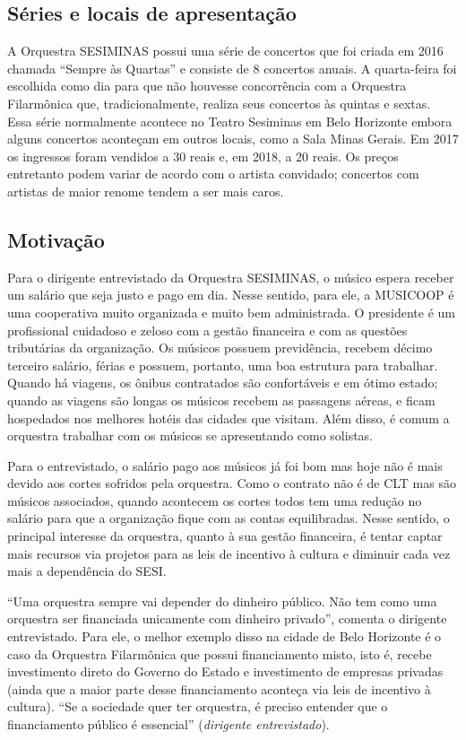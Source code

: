 \documentclass[a4paper, 12pt, openright, oneside, german, french, english, brazil]{abntex2}
\begin{document}
	\subsection{Séries e locais de apresentação}
	
	A Orquestra SESIMINAS possui uma série de concertos que foi criada em 2016 chamada ``Sempre às Quartas'' e consiste de 8 concertos anuais. A quarta-feira foi escolhida como dia para que não houvesse concorrência com a Orquestra Filarmônica que, tradicionalmente, realiza seus concertos às quintas e sextas. Essa série normalmente acontece no Teatro Sesiminas em Belo Horizonte embora alguns concertos aconteçam em outros locais, como a Sala Minas Gerais. Em 2017 os ingressos foram vendidos a 30 reais e, em 2018, a 20 reais. Os preços entretanto podem variar de acordo com o artista convidado; concertos com artistas de maior renome tendem a ser mais caros.
	
	\subsection{Motivação}
	
	Para o dirigente entrevistado da Orquestra SESIMINAS, o músico espera receber um salário que seja justo e pago em dia. Nesse sentido, para ele, a MUSICOOP é uma cooperativa muito organizada e muito bem administrada. O presidente é um profissional cuidadoso e zeloso com a gestão financeira e com as questões tributárias da organização. Os músicos possuem previdência, recebem décimo terceiro salário, férias e possuem, portanto, uma boa estrutura para trabalhar. Quando há viagens, os ônibus contratados são confortáveis e em ótimo estado; quando as viagens são longas os músicos recebem as passagens aéreas, e ficam hospedados nos melhores hotéis das cidades que visitam. Além disso, é comum a orquestra trabalhar com os músicos se apresentando como solistas.
	
	Para o entrevistado, o salário pago aos músicos já foi bom mas hoje não é mais devido aos cortes sofridos pela orquestra. Como o contrato não é de CLT mas são músicos associados, quando acontecem os cortes todos tem uma redução no salário para que a organização fique com as contas equilibradas. Nesse sentido, o principal interesse da orquestra, quanto à sua gestão financeira, é tentar captar mais recursos via projetos para as leis de incentivo à cultura e diminuir cada vez mais a dependência do SESI.
	
	``Uma orquestra sempre vai depender do dinheiro público. Não tem como uma orquestra ser financiada unicamente com dinheiro privado'', comenta o dirigente entrevistado. Para ele, o melhor exemplo disso na cidade de Belo Horizonte é o caso da Orquestra Filarmônica que possui financiamento misto, isto é, recebe investimento direto do Governo do Estado e investimento de empresas privadas (ainda que a maior parte desse financiamento aconteça via leis de incentivo à cultura). ``Se a sociedade quer ter orquestra, é preciso entender que o financiamento público é essencial'' (\textit{dirigente entrevistado}). 
	
\end{document}
